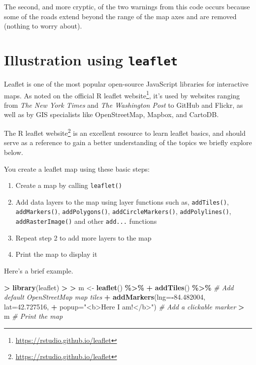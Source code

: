 \documentclass[
]{krantz}
\makeatletter
\newenvironment{Shaded}{\begin{snugshade}}{\end{snugshade}}
\newcommand{\CommentTok}[1]{\textcolor[rgb]{0.37,0.37,0.37}{\textit{#1}}}
\newcommand{\DataTypeTok}[1]{\textcolor[rgb]{0.27,0.27,0.27}{#1}}
\newcommand{\ErrorTok}[1]{\textcolor[rgb]{0.14,0.14,0.14}{\textbf{#1}}}
\newcommand{\FloatTok}[1]{\textcolor[rgb]{0.06,0.06,0.06}{#1}}
\newcommand{\KeywordTok}[1]{\textcolor[rgb]{0.27,0.27,0.27}{\textbf{#1}}}
\newcommand{\NormalTok}[1]{#1}
\newcommand{\OperatorTok}[1]{\textcolor[rgb]{0.43,0.43,0.43}{\textbf{#1}}}
\newcommand{\StringTok}[1]{\textcolor[rgb]{0.5,0.5,0.5}{#1}}
\providecommand{\tightlist}{%
  \setlength{\itemsep}{0pt}\setlength{\parskip}{0pt}}
\renewcommand{\href}[2]{#2\footnote{\url{#1}}}
\newenvironment{kframe}{%
\medskip{}
\setlength{\fboxsep}{.8em}
 \def\at@end@of@kframe{}%
 \ifinner\ifhmode%
  \def\at@end@of@kframe{\end{minipage}}%
  \begin{minipage}{\columnwidth}%
 \fi\fi%
 \def\FrameCommand##1{\hskip\@totalleftmargin \hskip-\fboxsep
 \colorbox{shadecolor}{##1}\hskip-\fboxsep
     \hskip-\linewidth \hskip-\@totalleftmargin \hskip\columnwidth}%
 \MakeFramed {\advance\hsize-\width
   \@totalleftmargin\z@ \linewidth\hsize
   \@setminipage}}%
 {\par\unskip\endMakeFramed%
 \at@end@of@kframe}
\renewenvironment{Shaded}{\begin{kframe}}{\end{kframe}}
\makeatother
\begin{document}
The second, and more cryptic, of the two warnings from this code occurs because some of the roads extend beyond the range of the map axes and are removed (nothing to worry about).

\hypertarget{illustration-using-leaflet}{%
\section{\texorpdfstring{Illustration using \texttt{leaflet}}{Illustration using leaflet}}\label{illustration-using-leaflet}}

Leaflet is one of the most popular open-source JavaScript libraries for interactive maps. As noted on the official \href{https://rstudio.github.io/leaflet}{R leaflet website}, it's used by websites ranging from \emph{The New York Times} and \emph{The Washington Post} to GitHub and Flickr, as well as by GIS specialists like OpenStreetMap, Mapbox, and CartoDB.

The \href{https://rstudio.github.io/leaflet}{R leaflet website} is an excellent resource to learn leaflet basics, and should serve as a reference to gain a better understanding of the topics we briefly explore below.

You create a leaflet map using these basic steps:

\begin{enumerate}
\def\labelenumi{\arabic{enumi}.}
\tightlist
\item
  Create a map by calling \texttt{leaflet()}
\item
  Add data layers to the map using layer functions such as, \texttt{addTiles()}, \texttt{addMarkers()}, \texttt{addPolygons()}, \texttt{addCircleMarkers()}, \texttt{addPolylines()}, \texttt{addRasterImage()} and other \texttt{add...} functions
\item
  Repeat step 2 to add more layers to the map
\item
  Print the map to display it
\end{enumerate}

Here's a brief example.

\begin{Shaded}
\begin{Highlighting}[]
\OperatorTok{\textgreater{}}\StringTok{ }\KeywordTok{library}\NormalTok{(leaflet)}
\OperatorTok{\textgreater{}}\StringTok{ }
\ErrorTok{\textgreater{}}\StringTok{ }\NormalTok{m \textless{}{-}}\StringTok{ }\KeywordTok{leaflet}\NormalTok{() }\OperatorTok{\%\textgreater{}\%}
\OperatorTok{+}\StringTok{       }\KeywordTok{addTiles}\NormalTok{() }\OperatorTok{\%\textgreater{}\%}\StringTok{  }\CommentTok{\# Add default OpenStreetMap map tiles}
\OperatorTok{+}\StringTok{       }\KeywordTok{addMarkers}\NormalTok{(}\DataTypeTok{lng=}\OperatorTok{{-}}\FloatTok{84.482004}\NormalTok{, }\DataTypeTok{lat=}\FloatTok{42.727516}\NormalTok{, }
\OperatorTok{+}\StringTok{                  }\DataTypeTok{popup=}\StringTok{"\textless{}b\textgreater{}Here I am!\textless{}/b\textgreater{}"}\NormalTok{) }\CommentTok{\# Add a clickable marker}
\OperatorTok{\textgreater{}}\StringTok{ }\NormalTok{m      }\CommentTok{\# Print the map}
\end{Highlighting}
\end{Shaded}
\end{document}
